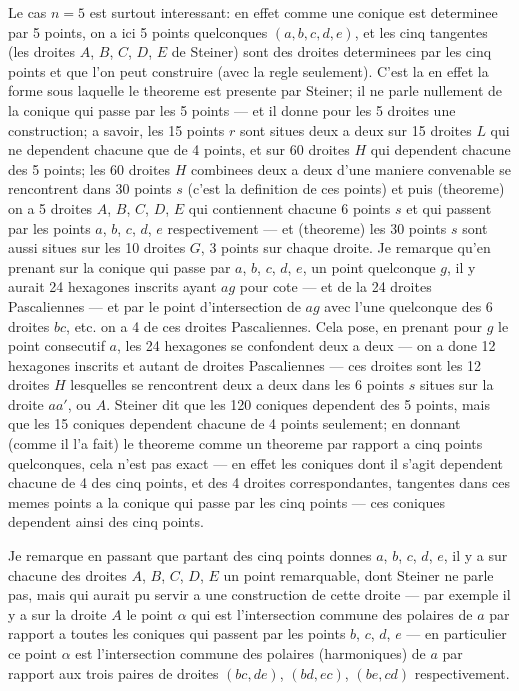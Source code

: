 \documentclass[11pt,a4paper]{article}
\theoremstyle{plain}
\begin{document}
Le cas $n=5$ est surtout interessant: en effet comme une conique est determinee par 5 points, on a ici 5 points quelconques $(a, b, c, d, e)$, et les cinq tangentes (les droites $A$, $B$, $C$, $D$, $E$ de Steiner) sont des droites determinees par les cinq points et que l'on peut construire (avec la regle seulement). C'est la en effet la forme sous laquelle le theoreme est presente par Steiner; il ne parle nullement de la conique qui passe par les 5 points --- et il donne pour les 5 droites une construction; a savoir, les 15 points $r$ sont situes deux a deux sur 15 droites $L$ qui ne dependent chacune que de 4 points, et sur 60 droites $H$ qui dependent chacune des 5 points; les 60 droites $H$ combinees deux a deux d'une maniere convenable se rencontrent dans 30 points $s$ (c'est la definition de ces points) et puis (theoreme) on a 5 droites $A$, $B$, $C$, $D$, $E$ qui contiennent chacune 6 points $s$ et qui passent par les points $a$, $b$, $c$, $d$, $e$ respectivement --- et (theoreme) les 30 points $s$ sont aussi situes sur les 10 droites $G$, 3 points sur chaque droite. Je remarque qu'en prenant sur la conique qui passe par $a$, $b$, $c$, $d$, $e$, un point quelconque $g$, il y aurait 24 hexagones inscrits ayant $ag$ pour cote --- et de la 24 droites Pascaliennes --- et par le point d'intersection de $ag$ avec l'une quelconque des 6 droites $bc$, etc. on a 4 de ces droites Pascaliennes. Cela pose, en prenant pour $g$ le point consecutif $a$, les 24 hexagones se confondent deux a deux --- on a done 12 hexagones inscrits et autant de droites Pascaliennes --- ces droites sont les 12 droites $H$ lesquelles se rencontrent deux a deux dans les 6 points $s$ situes sur la droite $aa'$, ou $A$. Steiner dit que les 120 coniques dependent des 5 points, mais que les 15 coniques dependent chacune de 4 points seulement; en donnant (comme il l'a fait) le theoreme comme un theoreme par rapport a cinq points quelconques, cela n'est pas exact --- en effet les coniques dont il s'agit dependent chacune de 4 des cinq points, et des 4 droites correspondantes, tangentes dans ces memes points a la conique qui passe par les cinq points --- ces coniques dependent ainsi des cinq points.

Je remarque en passant que partant des cinq points donnes $a$, $b$, $c$, $d$, $e$, il y a sur chacune des droites $A$, $B$, $C$, $D$, $E$ un point remarquable, dont Steiner ne parle pas, mais qui aurait pu servir a une construction de cette droite --- par exemple il y a sur la droite $A$ le point $\alpha$ qui est l'intersection commune des polaires de $a$ par rapport a toutes les coniques qui passent par les points $b$, $c$, $d$, $e$ --- en particulier ce point $\alpha$ est l'intersection commune des polaires (harmoniques) de $a$ par rapport aux trois paires de droites $(bc, de)$, $(bd, ec)$, $(be, cd)$ respectivement.
\end{document}
